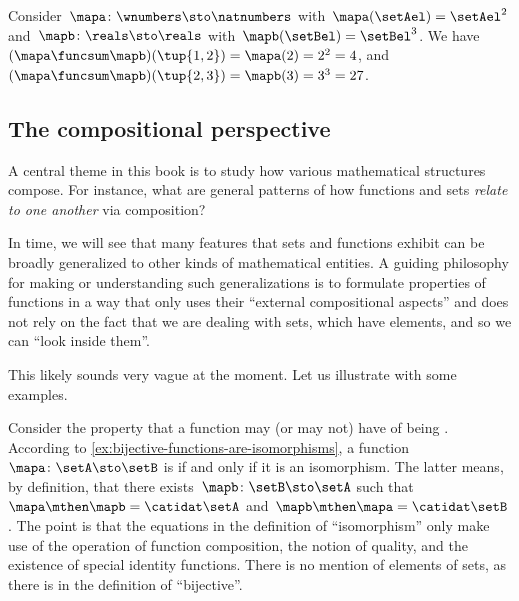 \begin{example}
    Consider~$\mapa\colon \wnumbers \sto \natnumbers$ with~$\mapa(\setAel)=\setAel^2$ and~$\mapb\colon \reals \sto \reals$ with~$\mapb(\setBel)=\setBel^3$.
    We have~$(\mapa \funcsum \mapb)(\tup{1,2})=\mapa(2)=2^2=4$, and~$(\mapa \funcsum \mapb)(\tup{2,3})=\mapb(3)=3^3 = 27$.
\end{example}

\subsection{The compositional perspective}

A central theme in this book is to study how various mathematical structures compose.
For instance, what are general patterns of how functions and sets \emph{relate to one another} via composition?

In time, we will see that many features that sets and functions exhibit can be broadly generalized to other kinds of mathematical entities.
A guiding philosophy for making or understanding such generalizations is to formulate properties of functions in a way that only uses their ``external compositional aspects'' and does not rely on the fact that we are dealing with sets, which have elements, and so we can ``look inside them''.

This likely sounds very vague at the moment.
Let us illustrate with some examples.

\begin{example}
    Consider the property that a function may (or may not) have of being .
    According to \cref{ex:bijective-functions-are-isomorphisms}, a function~$\mapa\colon \setA \sto \setB$ is  if and only if it is an isomorphism.
    The latter means, by definition, that there exists~$\mapb \colon \setB \sto \setA$ such that~$\mapa \mthen \mapb = \catidat\setA$ and~$\mapb \mthen \mapa = \catidat\setB$.
    The point is that the equations in the definition of ``isomorphism'' only make use of the operation of function composition, the notion of quality, and the existence of special identity functions.
    There is no mention of elements of sets, as there is in the definition of ``bijective''.
\end{example}

